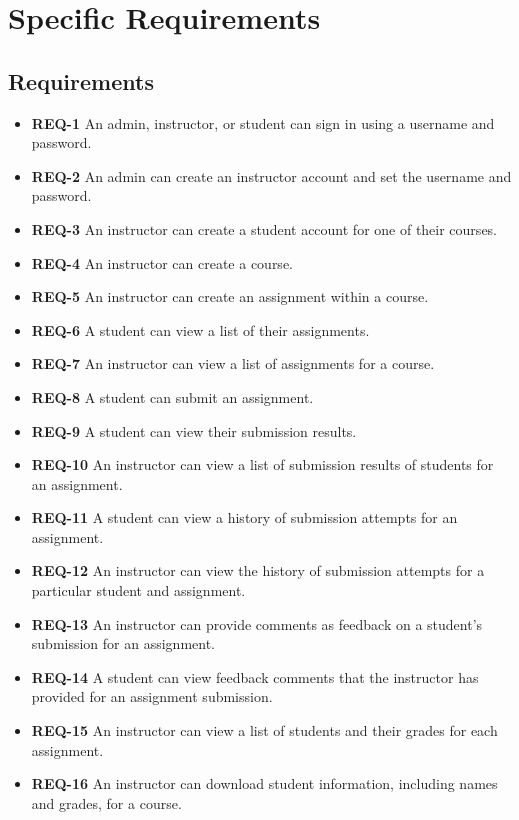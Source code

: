 \documentclass{article}
\begin{document}
\section{Specific Requirements}

\subsection{Requirements}

\begin{itemize}
  \item \textbf{REQ-1} An admin, instructor, or student can sign in using a username and password.
  \item \textbf{REQ-2} An admin can create an instructor account and set the username and password.
  \item \textbf{REQ-3} An instructor can create a student account for one of their courses.
  \item \textbf{REQ-4} An instructor can create a course.
  \item \textbf{REQ-5} An instructor can create an assignment within a course.
  \item \textbf{REQ-6} A student can view a list of their assignments.
  \item \textbf{REQ-7} An instructor can view a list of assignments for a course.
  \item \textbf{REQ-8} A student can submit an assignment.
  \item \textbf{REQ-9} A student can view their submission results.
  \item \textbf{REQ-10} An instructor can view a list of submission results of students for an assignment.
  \item \textbf{REQ-11} A student can view a history of submission attempts for an assignment.
  \item \textbf{REQ-12} An instructor can view the history of submission attempts for a particular student and assignment.
  \item \textbf{REQ-13} An instructor can provide comments as feedback on a student's submission for an assignment.
  \item \textbf{REQ-14} A student can view feedback comments that the instructor has provided for an assignment submission.
  \item \textbf{REQ-15} An instructor can view a list of students and their grades for each assignment.
  \item \textbf{REQ-16} An instructor can download student information, including names and grades, for a course.
\end{itemize}
\end{document}
